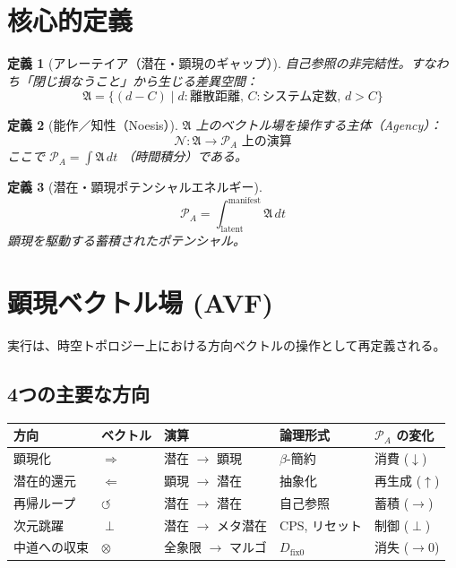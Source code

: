 \documentclass[12pt,a4paper]{ujarticle}
\newtheorem{definition}{定義}[section]
\newcommand{\aletheia}{\mathfrak{A}} %
\newcommand{\noesis}{\mathcal{N}}    %
\newcommand{\powa}{\mathcal{P}_A}    %
\newcommand{\dfix}{D_{\text{fix0}}}  %
\begin{document}
\section{核心的定義}

\begin{definition}[アレーテイア（潜在・顕現のギャップ）]
自己参照の非完結性。すなわち「閉じ損なうこと」から生じる差異空間：
\[
\aletheia = \{ (d - C) \mid d : \text{離散距離}, \, C : \text{システム定数}, \, d > C \}
\]
\end{definition}

\begin{definition}[能作／知性（Noesis）]
$\aletheia$ 上のベクトル場を操作する主体（Agency）：
\[
\noesis : \aletheia \to \powa \text{ 上の演算}
\]
ここで $\powa = \int \aletheia \, dt$ （時間積分）である。
\end{definition}

\begin{definition}[潜在・顕現ポテンシャルエネルギー]
\[
\powa = \int_{\text{latent}}^{\text{manifest}} \aletheia \, dt
\]
顕現を駆動する蓄積されたポテンシャル。
\end{definition}

\section{顕現ベクトル場 (AVF)}

実行は、時空トポロジー上における方向ベクトルの操作として再定義される。

\subsection{4つの主要な方向}

\begin{table}[h]
\centering
\small
\begin{tabular}{|l|l|l|l|l|}
\hline
\textbf{方向} & \textbf{ベクトル} & \textbf{演算} & \textbf{論理形式} & $\powa$ \textbf{の変化} \\
\hline
顕現化 & $\Rightarrow$ & 潜在 $\to$ 顕現 & $\beta$-簡約 & 消費 ($\downarrow$) \\
\hline
潜在的還元 & $\Leftarrow$ & 顕現 $\to$ 潜在 & 抽象化 & 再生成 ($\uparrow$) \\
\hline
再帰ループ & $\circlearrowleft$ & 潜在 $\to$ 潜在 & 自己参照 & 蓄積 ($\rightarrow$) \\
\hline
次元跳躍 & $\perp$ & 潜在 $\to$ メタ潜在 & CPS, リセット & 制御 ($\perp$) \\
\hline
中道への収束 & $\otimes$ & 全象限 $\to$ マルゴ & $\dfix$ & 消失 ($\to 0$) \\
\hline
\end{tabular}
\end{table}
\end{document}
